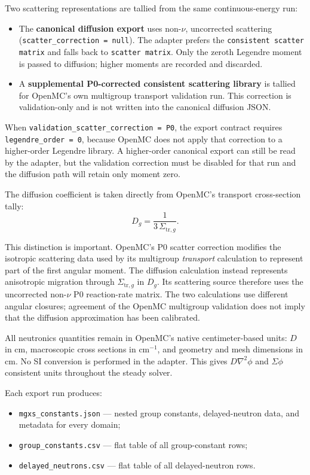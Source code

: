 \documentclass[11pt]{article}
\begin{document}
Two scattering representations are tallied from the same continuous-energy
run:
\begin{itemize}
  \item The \textbf{canonical diffusion export} uses non-$\nu$, uncorrected
        scattering (\texttt{scatter\_correction = null}).  The adapter prefers
        the \texttt{consistent scatter matrix} and falls back to
        \texttt{scatter matrix}.  Only the zeroth Legendre moment is passed to
        diffusion; higher moments are recorded and discarded.
  \item A \textbf{supplemental P0-corrected consistent scattering library}
        is tallied for OpenMC's own multigroup transport validation run.
        This correction is validation-only and is not written into the
        canonical diffusion JSON.
\end{itemize}

When \texttt{validation\_scatter\_correction = P0}, the export contract requires
\texttt{legendre\_order = 0}, because OpenMC does not apply that correction to
a higher-order Legendre library.  A higher-order canonical export can still be
read by the adapter, but the validation correction must be disabled for that
run and the diffusion path will retain only moment zero.

The diffusion coefficient is taken directly from OpenMC's transport
cross-section tally:
\[
D_g = \frac{1}{3\,\Sigma_{\mathrm{tr},g}} .
\]

This distinction is important.  OpenMC's P0 scatter correction modifies the
isotropic scattering data used by its multigroup \emph{transport} calculation
to represent part of the first angular moment.  The diffusion calculation
instead represents anisotropic migration through $\Sigma_{\mathrm{tr},g}$ in
$D_g$.  Its scattering source therefore uses the uncorrected non-$\nu$ P0
reaction-rate matrix.  The two calculations use different angular closures;
agreement of the OpenMC multigroup validation does not imply that the
diffusion approximation has been calibrated.

All neutronics quantities remain in OpenMC's native centimeter-based units:
$D$ in cm, macroscopic cross sections in cm$^{-1}$, and geometry and mesh
dimensions in cm.  No SI conversion is performed in the adapter.  This gives
$D\nabla^2\phi$ and $\Sigma\phi$ consistent units throughout the steady
solver.

Each export run produces:
\begin{itemize}
  \item \texttt{mgxs\_constants.json} --- nested group constants, delayed-neutron
        data, and metadata for every domain;
  \item \texttt{group\_constants.csv} --- flat table of all group-constant rows;
  \item \texttt{delayed\_neutrons.csv} --- flat table of all delayed-neutron rows.
\end{itemize}
\end{document}
